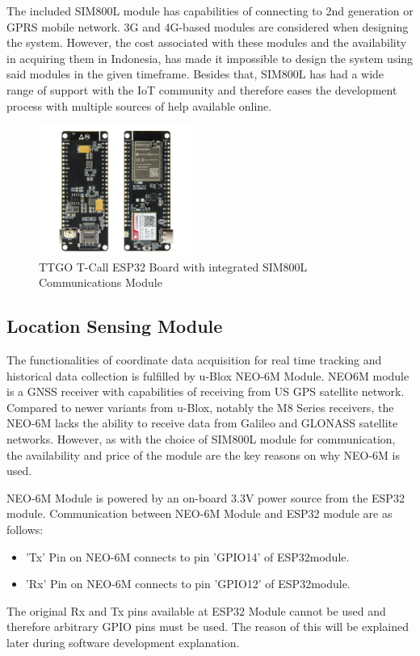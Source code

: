 \documentclass[conference]{IEEEtran}
\begin{document}
The included SIM800L module has capabilities of connecting to 2nd generation or GPRS mobile network. 3G and 4G-based modules are considered when designing the system. However, 
the cost associated with these modules and the availability in acquiring them in Indonesia, has made it impossible to design the system using said modules in the given timeframe. 
Besides that, SIM800L has had a wide range of support with the IoT community and therefore eases the development process with multiple sources of help available online.

\begin{figure}[htbp]
    \centering
    \includegraphics[width=0.45\textwidth]{gambaresp32}
    \caption{TTGO T-Call ESP32 Board with integrated SIM800L Communications Module}
    \label{fig1}
\end{figure}

\subsection{Location Sensing Module}
The functionalities of coordinate data acquisition for real time tracking and historical data collection is fulfilled by u-Blox NEO-6M Module. NEO6M module is a GNSS receiver with capabilities of receiving 
from US GPS satellite network. Compared to newer variants from u-Blox, notably the M8 Series receivers, the NEO-6M lacks the ability to receive data from Galileo and GLONASS satellite networks. However, as with 
the choice of SIM800L module for communication, the availability and price of the module are the key reasons on why NEO-6M is used.

NEO-6M Module is powered by an on-board 3.3V power source from the ESP32 module. Communication between NEO-6M Module and ESP32 module are as follows:
\begin{itemize}
\item 'Tx' Pin on NEO-6M connects to pin 'GPIO14' of ESP32module.
\item 'Rx' Pin on NEO-6M connects to pin 'GPIO12' of ESP32module.
\end{itemize}
The original Rx and Tx pins available at ESP32 Module cannot be used and therefore arbitrary GPIO pins must be used. The reason of this will be explained later during software development explanation.
\end{document}
